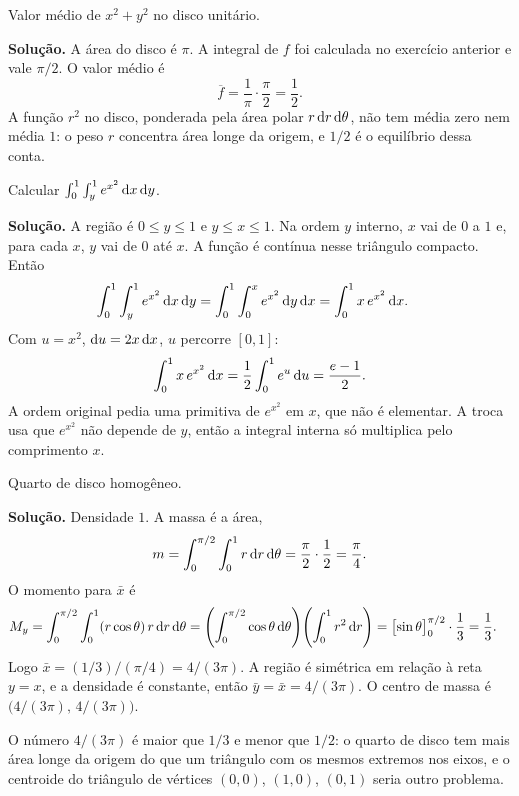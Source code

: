\documentclass[11pt,a4paper]{article}
\begin{document}
\begin{exercicio}
Valor médio de $x^2+y^2$ no disco unitário.

\textbf{Solução.}
A área do disco é $\pi$. A integral de $f$ foi calculada no exercício anterior e vale $\pi/2$. O valor médio é
\[
\overline{f}=\frac{1}{\pi}\cdot\frac{\pi}{2}=\frac12.
\]
A função $r^2$ no disco, ponderada pela área polar $r\,\mathrm{d} r\,\mathrm{d}\theta$, não tem média zero nem média $1$: o peso $r$ concentra área longe da origem, e $1/2$ é o equilíbrio dessa conta.
\end{exercicio}

\begin{exercicio}
Calcular $\int_0^1\int_y^1 e^{x^2}\,\mathrm{d} x\,\mathrm{d} y$.

\textbf{Solução.}
A região é $0\le y\le 1$ e $y\le x\le 1$. Na ordem $y$ interno, $x$ vai de $0$ a $1$ e, para cada $x$, $y$ vai de $0$ até $x$. A função é contínua nesse triângulo compacto. Então
\begin{align*}
\int_0^1\int_y^1 e^{x^2}\,\mathrm{d} x\,\mathrm{d} y
&=\int_0^1\int_0^x e^{x^2}\,\mathrm{d} y\,\mathrm{d} x
=\int_0^1 x\,e^{x^2}\,\mathrm{d} x.
\end{align*}
Com $u=x^2$, $\mathrm{d} u=2x\,\mathrm{d} x$, $u$ percorre $[0,1]$:
\[
\int_0^1 x\,e^{x^2}\,\mathrm{d} x=\frac12\int_0^1 e^u\,\mathrm{d} u=\frac{e-1}{2}.
\]
A ordem original pedia uma primitiva de $e^{x^2}$ em $x$, que não é elementar. A troca usa que $e^{x^2}$ não depende de $y$, então a integral interna só multiplica pelo comprimento $x$.
\end{exercicio}

\begin{exercicio}
Quarto de disco homogêneo.

\textbf{Solução.}
Densidade $1$. A massa é a área,
\[
m=\int_0^{\pi/2}\int_0^1 r\,\mathrm{d} r\,\mathrm{d}\theta
=\frac{\pi}{2}\cdot\frac12=\frac{\pi}{4}.
\]
O momento para $\bar x$ é
\begin{align*}
M_y
&=\int_0^{\pi/2}\int_0^1 (r\cos\theta)\,r\,\mathrm{d} r\,\mathrm{d}\theta
=\Biggl(\int_0^{\pi/2}\cos\theta\,\mathrm{d}\theta\Biggr)
\Biggl(\int_0^1 r^2\,\mathrm{d} r\Biggr)
=\bigl[\sin\theta\bigr]_0^{\pi/2}\cdot\frac13
=\frac13.
\end{align*}
Logo $\bar x=(1/3)/(\pi/4)=4/(3\pi)$. A região é simétrica em relação à reta $y=x$, e a densidade é constante, então $\bar y=\bar x=4/(3\pi)$. O centro de massa é $\bigl(4/(3\pi),\,4/(3\pi)\bigr)$.

O número $4/(3\pi)$ é maior que $1/3$ e menor que $1/2$: o quarto de disco tem mais área longe da origem do que um triângulo com os mesmos extremos nos eixos, e o centroide do triângulo de vértices $(0,0)$, $(1,0)$, $(0,1)$ seria outro problema.
\end{exercicio}
\end{document}
